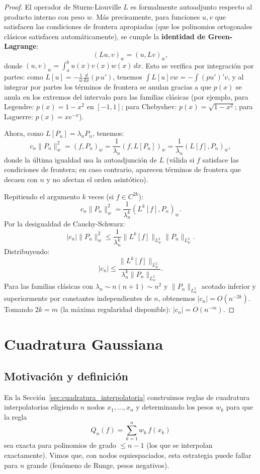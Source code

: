 \documentclass[a4paper,11pt]{report}
\begin{document}
\begin{proof}
El operador de Sturm-Liouville $L$ es formalmente autoadjunto respecto al producto interno con peso $w$. Más precisamente, para funciones $u, v$ que satisfacen las condiciones de frontera apropiadas (que los polinomios ortogonales clásicos satisfacen automáticamente), se cumple la \textbf{identidad de Green-Lagrange}:
\[
(Lu, v)_w = (u, Lv)_w,
\]
donde $(u,v)_w = \int_a^b u(x) v(x) w(x)\,dx$. Esto se verifica por integración por partes: como $L[u] = -\frac{1}{w}\frac{d}{dx}(p\,u')$, tenemos $\int L[u] v w = -\int (pu')' v$, y al integrar por partes los términos de frontera se anulan gracias a que $p(x)$ se anula en los extremos del intervalo para las familias clásicas (por ejemplo, para Legendre: $p(x)=1-x^2$ en $[-1,1]$; para Chebyshev: $p(x)=\sqrt{1-x^2}$; para Laguerre: $p(x)=xe^{-x}$).

Ahora, como $L[P_n] = \lambda_n P_n$, tenemos:
\[
c_n \|P_n\|_w^2 = (f, P_n)_w = \frac{1}{\lambda_n}(f, L[P_n])_w = \frac{1}{\lambda_n}(L[f], P_n)_w,
\]
donde la última igualdad usa la autoadjunción de $L$ (válida si $f$ satisface las condiciones de frontera; en caso contrario, aparecen términos de frontera que decaen con $n$ y no afectan el orden asintótico).

Repitiendo el argumento $k$ veces (si $f \in C^{2k}$):
\[
c_n \|P_n\|_w^2 = \frac{1}{\lambda_n^k}(L^k[f], P_n)_w.
\]
Por la desigualdad de Cauchy-Schwarz:
\[
|c_n| \|P_n\|_w^2 \leq \frac{1}{\lambda_n^k} \|L^k[f]\|_{L^2_w} \|P_n\|_{L^2_w}.
\]
Distribuyendo:
\[
|c_n| \leq \frac{\|L^k[f]\|_{L^2_w}}{\lambda_n^k \|P_n\|_{L^2_w}}.
\]
Para las familias clásicas con $\lambda_n \sim n(n+1) \sim n^2$ y $\|P_n\|_{L^2_w}$ acotado inferior y superiormente por constantes independientes de $n$, obtenemos $|c_n| = O(n^{-2k})$. Tomando $2k = m$ (la máxima regularidad disponible): $|c_n| = O(n^{-m})$.
\end{proof}

\section{Cuadratura Gaussiana}\label{sec:cuadratura_gaussiana}

\subsection{Motivación y definición}

En la Sección~\ref{sec:cuadratura_interpolatoria} construimos reglas de cuadratura interpolatorias eligiendo $n$ nodos $x_1, \ldots, x_n$ y determinando los pesos $w_k$ para que la regla
\[
Q_n(f) = \sum_{k=1}^n w_k\,f(x_k)
\]
sea exacta para polinomios de grado $\leq n-1$ (los que se interpolan exactamente).  Vimos que, con nodos equiespaciados, esta estrategia puede fallar para $n$ grande (fenómeno de Runge, pesos negativos).
\end{document}
